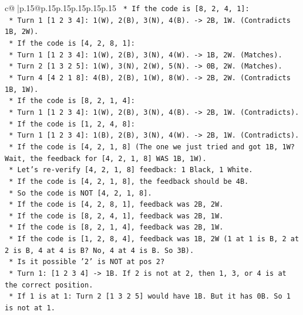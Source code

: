 \documentclass{article}
\begin{document}
{\begin{supertabular}{c@{$\;$}|p{.15\linewidth}@{}p{.15\linewidth}p{.15\linewidth}p{.15\linewidth}p{.15\linewidth}p{.15\linewidth}}
{{{\texttt{    *   If the code is {[}8, 2, 4, 1{]}:} \\
\texttt{        *   Turn 1 {[}1 2 3 4{]}: 1(W), 2(B), 3(N), 4(B). {-}> 2B, 1W. (Contradicts 1B, 2W).} \\
\texttt{    *   If the code is {[}4, 2, 8, 1{]}:} \\
\texttt{        *   Turn 1 {[}1 2 3 4{]}: 1(W), 2(B), 3(N), 4(W). {-}> 1B, 2W. (Matches).} \\
\texttt{        *   Turn 2 {[}1 3 2 5{]}: 1(W), 3(N), 2(W), 5(N). {-}> 0B, 2W. (Matches).} \\
\texttt{        *   Turn 4 {[}4 2 1 8{]}: 4(B), 2(B), 1(W), 8(W). {-}> 2B, 2W. (Contradicts 1B, 1W).} \\
\texttt{    *   If the code is {[}8, 2, 1, 4{]}:} \\
\texttt{        *   Turn 1 {[}1 2 3 4{]}: 1(W), 2(B), 3(N), 4(B). {-}> 2B, 1W. (Contradicts).} \\
\texttt{    *   If the code is {[}1, 2, 4, 8{]}:} \\
\texttt{        *   Turn 1 {[}1 2 3 4{]}: 1(B), 2(B), 3(N), 4(W). {-}> 2B, 1W. (Contradicts).} \\
\texttt{    *   If the code is {[}4, 2, 1, 8{]} (The one we just tried and got 1B, 1W? Wait, the feedback for {[}4, 2, 1, 8{]} WAS 1B, 1W).} \\
\texttt{        *   Let's re{-}verify {[}4, 2, 1, 8{]} feedback: 1 Black, 1 White.} \\
\texttt{        *   If the code is {[}4, 2, 1, 8{]}, the feedback should be 4B.} \\
\texttt{        *   So the code is NOT {[}4, 2, 1, 8{]}.} \\
\texttt{        *   If the code is {[}4, 2, 8, 1{]}, feedback was 2B, 2W.} \\
\texttt{        *   If the code is {[}8, 2, 4, 1{]}, feedback was 2B, 1W.} \\
\texttt{        *   If the code is {[}8, 2, 1, 4{]}, feedback was 2B, 1W.} \\
\texttt{        *   If the code is {[}1, 2, 8, 4{]}, feedback was 1B, 2W (1 at 1 is B, 2 at 2 is B, 4 at 4 is B? No, 4 at 4 is B. So 3B).} \\
\texttt{        *   Is it possible '2' is NOT at pos 2?} \\
\texttt{            *   Turn 1: {[}1 2 3 4{]} {-}> 1B. If 2 is not at 2, then 1, 3, or 4 is at the correct position.} \\
\texttt{            *   If 1 is at 1: Turn 2 {[}1 3 2 5{]} would have 1B. But it has 0B. So 1 is not at 1.} \\
}}}
\end{supertabular}}
\end{document}
